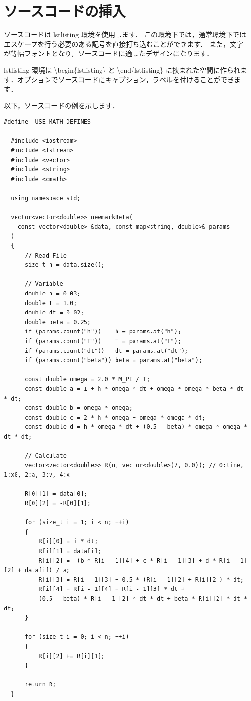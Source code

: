 \documentclass[11pt,a4j,onecolumn]{jsreport} %
\begin{document}
\section{ソースコードの挿入}

ソースコードは lstlisting 環境を使用します．
この環境下では，通常環境下ではエスケープを行う必要のある記号を直接打ち込むことができます．
また，文字が等幅フォントとなり，ソースコードに適したデザインになります．

lstlisting 環境は \textbackslash begin\{lstlisting\} と \textbackslash end\{lstlisting\}
に挟まれた空間に作られます．オプションでソースコードにキャプション，ラベルを付けることができます．

以下，ソースコードの例を示します．

\begin{lstlisting}[caption={newmarkBeta.cpp}, label={ls:newmarkBeta}]
  #define _USE_MATH_DEFINES

  #include <iostream>
  #include <fstream>
  #include <vector>
  #include <string>
  #include <cmath>
  
  using namespace std;
  
  vector<vector<double>> newmarkBeta( 
    const vector<double> &data, const map<string, double>& params
  )
  {
      // Read File
      size_t n = data.size();
  
      // Variable
      double h = 0.03;
      double T = 1.0;
      double dt = 0.02;
      double beta = 0.25;
      if (params.count("h"))    h = params.at("h");
      if (params.count("T"))    T = params.at("T");
      if (params.count("dt"))   dt = params.at("dt");
      if (params.count("beta")) beta = params.at("beta");
  
      const double omega = 2.0 * M_PI / T;
      const double a = 1 + h * omega * dt + omega * omega * beta * dt * dt;
      const double b = omega * omega;
      const double c = 2 * h * omega + omega * omega * dt;
      const double d = h * omega * dt + (0.5 - beta) * omega * omega * dt * dt;
  
      // Calculate
      vector<vector<double>> R(n, vector<double>(7, 0.0)); // 0:time, 1:x0, 2:a, 3:v, 4:x
  
      R[0][1] = data[0];
      R[0][2] = -R[0][1];
  
      for (size_t i = 1; i < n; ++i)
      {
          R[i][0] = i * dt;
          R[i][1] = data[i];
          R[i][2] = -(b * R[i - 1][4] + c * R[i - 1][3] + d * R[i - 1][2] + data[i]) / a;
          R[i][3] = R[i - 1][3] + 0.5 * (R[i - 1][2] + R[i][2]) * dt;
          R[i][4] = R[i - 1][4] + R[i - 1][3] * dt + 
          (0.5 - beta) * R[i - 1][2] * dt * dt + beta * R[i][2] * dt * dt;
      }
  
      for (size_t i = 0; i < n; ++i)
      {
          R[i][2] += R[i][1];
      }

      return R;
  }
\end{lstlisting}
\end{document}
